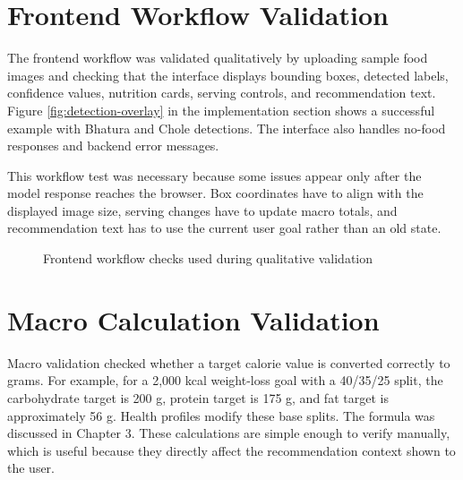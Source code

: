 \section{Frontend Workflow Validation}

The frontend workflow was validated qualitatively by uploading sample food images and checking that the interface displays bounding boxes, detected labels, confidence values, nutrition cards, serving controls, and recommendation text. Figure \ref{fig:detection-overlay} in the implementation section shows a successful example with Bhatura and Chole detections. The interface also handles no-food responses and backend error messages.

This workflow test was necessary because some issues appear only after the model response reaches the browser. Box coordinates have to align with the displayed image size, serving changes have to update macro totals, and recommendation text has to use the current user goal rather than an old state.

\begin{figure}[H]
\centering
{}
\caption{Frontend workflow checks used during qualitative validation}
\label{fig:frontend-workflow-validation}
\end{figure}

\section{Macro Calculation Validation}

Macro validation checked whether a target calorie value is converted correctly to grams. For example, for a 2,000 kcal weight-loss goal with a 40/35/25 split, the carbohydrate target is 200 g, protein target is 175 g, and fat target is approximately 56 g. Health profiles modify these base splits. The formula was discussed in Chapter 3. These calculations are simple enough to verify manually, which is useful because they directly affect the recommendation context shown to the user.

